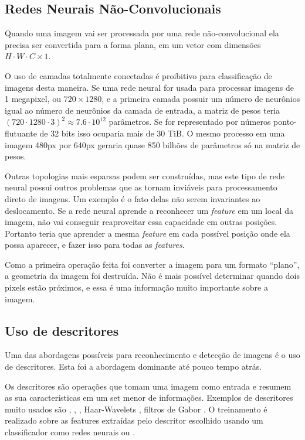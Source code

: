 \subsection{Redes Neurais Não-Convolucionais}
Quando uma imagem vai ser processada por uma rede não-convolucional ela precisa
ser convertida para a forma plana, em um vetor com dimensões
$H \cdot W \cdot C \times 1$.

O uso de camadas totalmente conectadas é proibitivo para classificação de
imagens desta maneira. Se uma rede neural for usada para processar imagens de 1
megapixel, ou $720 \times 1280$, e a primeira camada possuir um
número de neurônios igual
ao número de neurônios da camada de entrada, a matriz de pesos teria
$(720 \cdot 1280 \cdot 3)^2 \approx 7.6 \cdot 10^{12}$ parâmetros. Se for
representado por números ponto-flutuante de 32 bits isso ocuparia mais de
30 TiB. O mesmo processo em uma imagem 480px por 640px geraria quase 850
bilhões de parâmetros só na matriz de pesos.

Outras topologias mais esparsas podem ser construídas, mas este tipo de rede
neural possui outros problemas que as tornam inviáveis para processamento direto
de imagens. Um exemplo é o fato delas não serem invariantes ao deslocamento. Se
a rede neural aprende a reconhecer um \emph{feature} em um local da
imagem, não vai
conseguir reaproveitar essa capacidade em outras posições. Portanto teria que
aprender a mesma \emph{feature} em cada possível posição onde ela possa
aparecer, e fazer isso para todas as \emph{features}.

Como a primeira operação feita foi converter a imagem para um formato “plano”, a
geometria da imagem foi destruída. Não é mais possível determinar quando dois
pixels estão próximos, e essa é uma informação muito importante sobre a imagem.

\subsection{Uso de descritores}
Uma das abordagens possíveis para reconhecimento e detecção de imagens é o uso
de descritores. Esta foi a abordagem dominante até pouco tempo atrás.

Os descritores são operações que tomam uma imagem como entrada e resumem as sua
características em um set menor de informações. Exemplos de descritores muito
usados são  \cite{wang1990texture},
 \cite{rublee2011orb},
 \cite{dalal2005histograms},
Haar-Wavelets \cite{nabout2008object},
filtros de Gabor \cite{riaz2012invariant}. O treinamento é realizado sobre
as features extraídas pelo descritor escolhido usando um classificador como
redes neurais ou .

